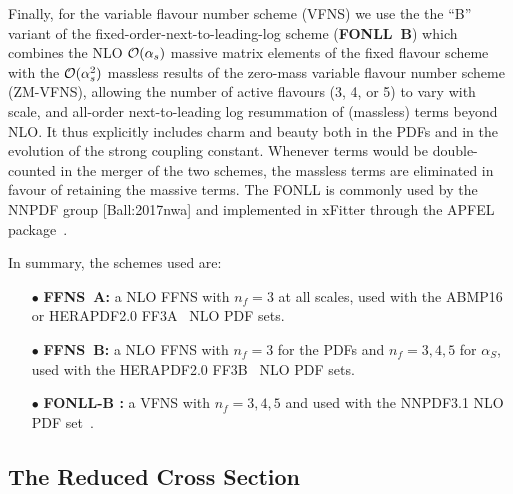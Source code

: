 \documentclass[pdftex,twocolumn,epjc3]{svjour3}          %
\newcommand{\abmp} {ABMP16\xspace}
\newcommand{\nnpdf} {NNPDF3.1\xspace}
\newcommand{\ffns} {{FFNS~A}\xspace}
\newcommand{\ffnsb} {{FFNS~B}\xspace}
\newcommand{\ffthreea} {{\hbox{HERAPDF2.0} FF3A}\xspace}
\newcommand{\ffthreeb} {{\hbox{HERAPDF2.0} FF3B}\xspace}
\begin{document}
Finally, for the  variable flavour number  scheme (VFNS) we use the
the ``B'' variant of the 
fixed-order-next-to-leading-log scheme ({\bf FONLL~B}) which combines the NLO 
${\cal O}(\alpha_s)$ massive matrix elements of the fixed flavour scheme with the 
${\cal O}(\alpha_s^2)$ massless results of the zero-mass variable flavour number 
scheme (ZM-VFNS), allowing the number of active flavours (3, 4, or 5) to vary 
with scale, and all-order next-to-leading log resummation of (massless) terms 
beyond NLO. 
It thus explicitly includes charm and beauty both in the PDFs and in the 
evolution of the strong coupling constant.
Whenever terms would be double-counted in the merger of the two schemes, 
the massless terms are eliminated in favour of retaining the massive terms.  
The FONLL is commonly used by the NNPDF group [Ball:2017nwa] and implemented in 
xFitter through the APFEL package~\cite{Bertone:2013vaa}.

  
In summary, the schemes used are:
\begin{itemize}
  \setlength\itemsep{1em}

\item[$\bullet$] {\bf \ffns :} a NLO FFNS with $n_f = 3$ at all
  scales, used with the \abmp~\cite{Alekhin:2018pai} or
  \ffthreea~\cite{Abramowicz:2015mha} NLO PDF sets.

\item[$\bullet$] {\bf \ffnsb :} a NLO FFNS with $n_f = 3$ for the PDFs
  and $n_f = 3,4,5$ for $\alpha_S$, used with the \ffthreeb~\cite{Abramowicz:2015mha}
  NLO PDF sets.

\item[$\bullet$] {\bf FONLL-B :} a VFNS with $n_f = 3,4,5$ and used
  with the \nnpdf NLO PDF set~\cite{Ball:2017nwa}.

\end{itemize}


\subsection{The Reduced Cross Section}\label{sec-redsigma}
\end{document}
